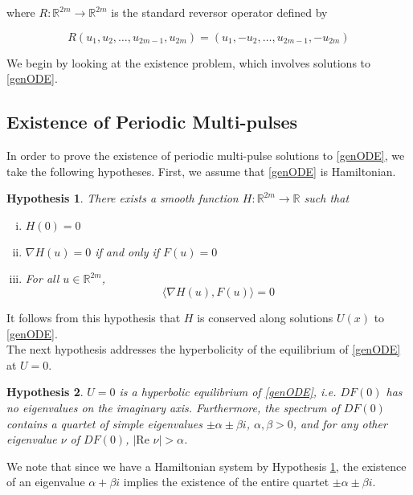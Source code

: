 \documentclass[12pt]{article}
\def\R{{\mathbb R}}
\newtheorem{hypothesis}{Hypothesis}
\begin{document}
where $R:\R^{2m} \rightarrow \R^{2m}$ is the standard reversor operator defined by

\begin{equation}\label{reverserR2m}
R(u_1, u_2, \dots, u_{2m-1}, u_{2m}) = (u_1, -u_2, \dots, u_{2m-1}, -u_{2m})
\end{equation}

We begin by looking at the existence problem, which involves solutions to \eqref{genODE}.

\subsection{Existence of Periodic Multi-pulses}

In order to prove the existence of periodic multi-pulse solutions to \eqref{genODE}, we take the following hypotheses. First, we assume that \eqref{genODE} is Hamiltonian.

\begin{hypothesis}\label{Hhyp}
There exists a smooth function $H: \R^{2m} \rightarrow \R$ such that 
\begin{enumerate}[(i)]
\item $H(0) = 0$
\item $\nabla H(u) = 0$ if and only if $F(u) = 0$
\item For all $u \in \R^{2m}$,
\begin{equation}
\langle \nabla H(u), F(u) \rangle = 0
\end{equation}
\end{enumerate}
\end{hypothesis}

It follows from this hypothesis that $H$ is conserved along solutions $U(x)$ to \eqref{genODE}.\\

The next hypothesis addresses the hyperbolicity of the equilibrium of \eqref{genODE} at $U = 0$.  

\begin{hypothesis}\label{hypeqhyp}
$U = 0$ is a hyperbolic equilibrium of \eqref{genODE}, i.e. $DF(0)$ has no eigenvalues on the imaginary axis. Furthermore, the spectrum of $DF(0)$ contains a quartet of simple eigenvalues $\pm \alpha \pm \beta i$, $\alpha, \beta > 0$, and for any other eigenvalue $\nu$ of $DF(0)$, $|\text{Re }\nu| > \alpha$.
\end{hypothesis}

We note that since we have a Hamiltonian system by Hypothesis \ref{Hhyp}, the existence of an eigenvalue $\alpha + \beta i$ implies the existence of the entire quartet $\pm \alpha \pm \beta i$.\\
\end{document}
